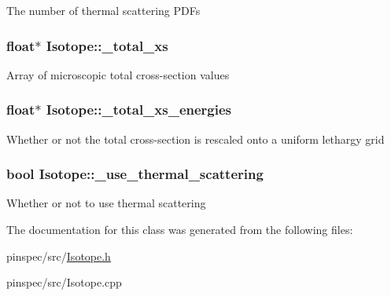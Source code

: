 The number of thermal scattering P\-D\-Fs \hypertarget{classIsotope_a92906b0ef21e25db8688b239d6dbfb58}{
\subsubsection[{\-\_\-total\-\_\-xs}]{\setlength{\rightskip}{0pt plus 5cm}float$\ast$ Isotope\-::\-\_\-total\-\_\-xs\hspace{0.3cm}{\ttfamily [private]}}}\label{classIsotope_a92906b0ef21e25db8688b239d6dbfb58}
Array of microscopic total cross-\/section values \hypertarget{classIsotope_a143a0cbba4e478f064cda7ce9ee0e8fb}{
\subsubsection[{\-\_\-total\-\_\-xs\-\_\-energies}]{\setlength{\rightskip}{0pt plus 5cm}float$\ast$ Isotope\-::\-\_\-total\-\_\-xs\-\_\-energies\hspace{0.3cm}{\ttfamily [private]}}}\label{classIsotope_a143a0cbba4e478f064cda7ce9ee0e8fb}
Whether or not the total cross-\/section is rescaled onto a uniform lethargy grid \hypertarget{classIsotope_aabb478cc4ceefb44824230c03d68c881}{
\subsubsection[{\-\_\-use\-\_\-thermal\-\_\-scattering}]{\setlength{\rightskip}{0pt plus 5cm}bool Isotope\-::\-\_\-use\-\_\-thermal\-\_\-scattering\hspace{0.3cm}{\ttfamily [private]}}}\label{classIsotope_aabb478cc4ceefb44824230c03d68c881}
Whether or not to use thermal scattering 

The documentation for this class was generated from the following files\-:\begin{DoxyCompactItemize}
\item 
pinspec/src/\hyperlink{Isotope_8h}{Isotope.\-h}\item 
pinspec/src/Isotope.\-cpp\end{DoxyCompactItemize}
